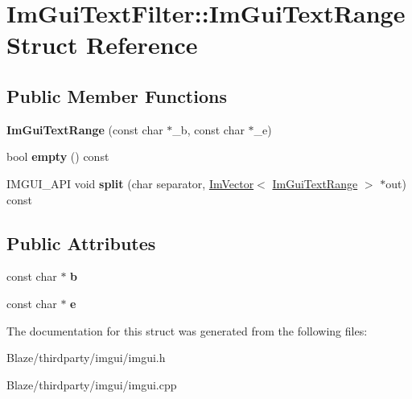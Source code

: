\hypertarget{structImGuiTextFilter_1_1ImGuiTextRange}{}\section{Im\+Gui\+Text\+Filter\+:\+:Im\+Gui\+Text\+Range Struct Reference}
\label{structImGuiTextFilter_1_1ImGuiTextRange}
\subsection*{Public Member Functions}
\begin{DoxyCompactItemize}
\item 
\mbox{\label{structImGuiTextFilter_1_1ImGuiTextRange_aa6912a579ec0907976635b89a9a23da0}} 
{\bfseries Im\+Gui\+Text\+Range} (const char $\ast$\+\_\+b, const char $\ast$\+\_\+e)
\item 
\mbox{\label{structImGuiTextFilter_1_1ImGuiTextRange_a1861f25905e1f19f979998faf5349b5a}} 
bool {\bfseries empty} () const
\item 
\mbox{\label{structImGuiTextFilter_1_1ImGuiTextRange_ace58f9b4795033f695344a0e660ee2af}} 
I\+M\+G\+U\+I\+\_\+\+A\+PI void {\bfseries split} (char separator, \hyperlink{structImVector}{Im\+Vector}$<$ \hyperlink{structImGuiTextFilter_1_1ImGuiTextRange}{Im\+Gui\+Text\+Range} $>$ $\ast$out) const
\end{DoxyCompactItemize}
\subsection*{Public Attributes}
\begin{DoxyCompactItemize}
\item 
\mbox{\label{structImGuiTextFilter_1_1ImGuiTextRange_a18a2df587336eecc6ba62c4275a4b7c8}} 
const char $\ast$ {\bfseries b}
\item 
\mbox{\label{structImGuiTextFilter_1_1ImGuiTextRange_aa522cbb493ad3e02646938661c37ec0e}} 
const char $\ast$ {\bfseries e}
\end{DoxyCompactItemize}


The documentation for this struct was generated from the following files\+:\begin{DoxyCompactItemize}
\item 
Blaze/thirdparty/imgui/imgui.\+h\item 
Blaze/thirdparty/imgui/imgui.\+cpp\end{DoxyCompactItemize}
